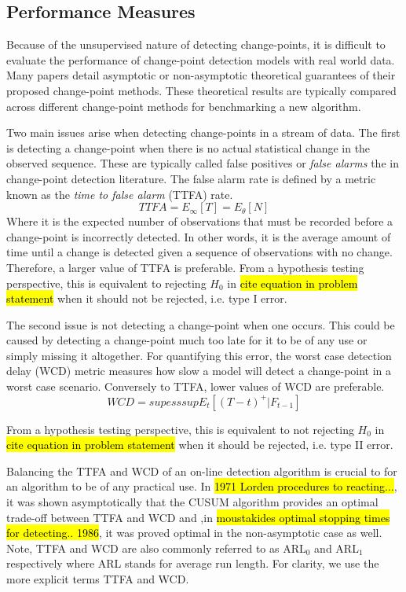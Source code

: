 \subsection{Performance Measures}
Because of the unsupervised nature of detecting change-points, it is difficult to evaluate the performance of change-point detection models with real world data. Many papers detail asymptotic or non-asymptotic theoretical guarantees of their proposed change-point methods.  These theoretical results are typically compared across different change-point methods for benchmarking a new algorithm.

Two main issues arise when detecting change-points in a stream of data. The first is detecting a change-point when there is no actual statistical change in the observed sequence. These are typically called false positives or \textit{false alarms} the in change-point detection literature. The false alarm rate is defined by a metric known as the \textit{time to false alarm} (TTFA) rate. 
\begin{equation}
TTFA = E_{\infty}[T] = E_{\theta}[N]
\end{equation}
Where it is the expected number of observations that must be recorded before a change-point is incorrectly detected. In other words, it is the average amount of time until a change is detected given a sequence of observations with no change. Therefore, a larger value of TTFA is preferable. From a hypothesis testing perspective, this is equivalent to rejecting $H_0$ in \hl{cite equation in problem statement} when it should not be rejected, i.e. type I error.

The second issue is not detecting a change-point when one occurs. This could be caused by detecting a change-point much too late for it to be of any use or simply missing it altogether. For quantifying this error, the worst case detection delay (WCD) metric measures how slow a model will detect a  change-point in a worst case scenario. Conversely to TTFA, lower values of WCD are preferable.
\begin{equation}
WCD = sup esssup E_t[(T-t)^+ | F_{t-1}]
\end{equation}

From a hypothesis testing perspective, this is equivalent to not rejecting $H_0$ in \hl{cite equation in problem statement} when it should be rejected, i.e. type II error.

Balancing the TTFA and WCD of an on-line detection algorithm is crucial to for an algorithm to be of any practical use. In \hl{1971 Lorden procedures to reacting...}, it was shown asymptotically that the CUSUM algorithm provides an optimal trade-off between TTFA and WCD and ,in \hl{moustakides optimal stopping times for detecting.. 1986}, it was proved optimal in the non-asymptotic case as well. Note, TTFA and WCD are also commonly referred to as ARL$_0$ and ARL$_1$ respectively where ARL stands for average run length. For clarity, we use the more explicit terms TTFA and WCD.

